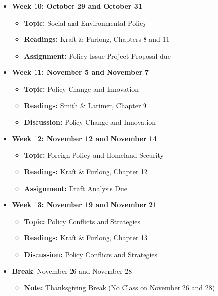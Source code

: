\documentclass[12pt, letterpaper]{article}
\begin{document}
\begin{itemize}
    \item \textbf{Week 10: October 29 and October 31}
    \begin{itemize}
        \item \textbf{Topic:} Social and Environmental Policy
        \item \textbf{Readings:} Kraft \& Furlong, Chapters 8 and 11
        \item \textbf{Assignment:} Policy Issue Project Proposal due
    \end{itemize}

    \item \textbf{Week 11: November 5 and November 7}
    \begin{itemize}
        \item \textbf{Topic:} Policy Change and Innovation
        \item \textbf{Readings:} Smith \& Larimer, Chapter 9
        \item \textbf{Discussion:} Policy Change and Innovation
    \end{itemize}

    \item \textbf{Week 12: November 12 and November 14}
    \begin{itemize}
        \item \textbf{Topic:} Foreign Policy and Homeland Security
        \item \textbf{Readings:} Kraft \& Furlong, Chapter 12
        \item \textbf{Assignment:} Draft Analysis Due
    \end{itemize}

    \item \textbf{Week 13: November 19 and November 21}
    \begin{itemize}
        \item \textbf{Topic:} Policy Conflicts and Strategies
        \item \textbf{Readings:} Kraft \& Furlong, Chapter 13
        \item \textbf{Discussion:} Policy Conflicts and Strategies
    \end{itemize}

    \item \textbf{Break}: November 26 and November 28
    \begin{itemize}
        \item \textbf{Note:} Thanksgiving Break (No Class on November 26 and 28)
    \end{itemize}


\end{itemize}
\end{document}
